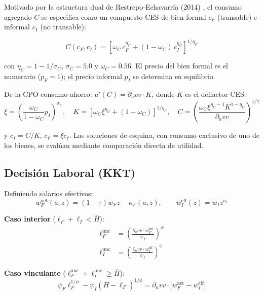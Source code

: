 \documentclass[12pt]{article}
\newcommand{\dVa}{\partial_a v}
\begin{document}
Motivado por la estructura dual de Restrepo-Echavarría (2014) \cite{restrepo2014}, el consumo agregado $C$ se especifica como un compuesto CES de bien formal $c_F$ (transable) e informal $c_I$ (no transable):

\begin{equation}\label{eq:ces}
C(c_F, c_I) = \left[ \omega_C \, c_F^{\eta_C} + (1-\omega_C) \, c_I^{\eta_C} \right]^{1/\eta_C}
\end{equation}

con $\eta_C = 1 - 1/\sigma_C$, $\sigma_C = 5.0$ y $\omega_C = 0.56$. El precio del bien formal es el numerario ($p_F = 1$); el precio informal $p_I$ se determina en equilibrio.

De la CPO consumo-ahorro: $u'(C) = \dVa v \cdot K$, donde $K$ es el deflactor CES:
\begin{equation}\label{eq:ces_foc}
\xi = \left(\frac{\omega_C}{1-\omega_C} p_I\right)^{\sigma_C}, \quad
K = \left[ \omega_C \xi^{\eta_C} + (1-\omega_C) \right]^{1/\eta_C}, \quad
C = \left(\frac{\omega_C \xi^{\eta_C-1} K^{1-\eta_C}}{\dVa v}\right)^{1/\gamma}
\end{equation}

y $c_I = C/K$, $c_F = \xi c_I$. Las soluciones de esquina, con consumo exclusivo de uno de los bienes, se evalúan mediante comparación directa de utilidad.

\subsection{Decisión Laboral (KKT)}\label{sec:kkt}

Definiendo salarios efectivos:
\begin{equation}
w_F^{\text{net}}(a,z) = (1-\tau) w_F z - \kappa_F(a,z), \qquad
w_I^{\text{eff}}(z) = \tilde{w}_I z^{\nu_I}
\end{equation}

\textbf{Caso interior} ($\ell_F + \ell_I < \bar{H}$):
\begin{align}
\ell_F^{\text{unc}} &= \left( \frac{\dVa v \cdot w_F^{\text{net}}}{\psi_F} \right)^{\phi} \label{eq:foc_F}\\
\ell_I^{\text{unc}} &= \left( \frac{\dVa v \cdot w_I^{\text{eff}}}{\psi_I} \right)^{\phi} \label{eq:foc_I}
\end{align}

\textbf{Caso vinculante} ($\ell_F^{\text{unc}} + \ell_I^{\text{unc}} \ge \bar{H}$):
\begin{equation}\label{eq:kkt_binding}
\psi_F \ell_F^{1/\phi} - \psi_I (\bar{H} - \ell_F)^{1/\phi} = \dVa v \cdot \big[w_F^{\text{net}} - w_I^{\text{eff}}\big]
\end{equation}
\end{document}
